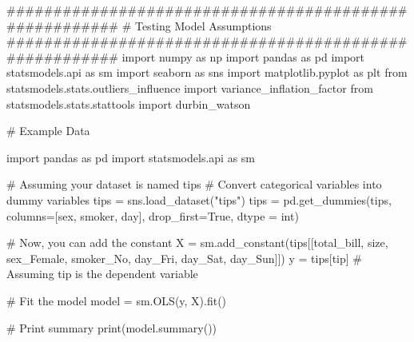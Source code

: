 \documentclass[
  letterpaper,
  DIV=11,
  numbers=noendperiod]{scrreprt}
\newenvironment{Shaded}{\begin{snugshade}}{\end{snugshade}}
\newcommand{\BuiltInTok}[1]{\textcolor[rgb]{0.00,0.23,0.31}{#1}}
\newcommand{\CommentTok}[1]{\textcolor[rgb]{0.37,0.37,0.37}{#1}}
\newcommand{\ImportTok}[1]{\textcolor[rgb]{0.00,0.46,0.62}{#1}}
\newcommand{\NormalTok}[1]{\textcolor[rgb]{0.00,0.23,0.31}{#1}}
\newcommand{\OperatorTok}[1]{\textcolor[rgb]{0.37,0.37,0.37}{#1}}
\newcommand{\StringTok}[1]{\textcolor[rgb]{0.13,0.47,0.30}{#1}}
\newcommand{\VariableTok}[1]{\textcolor[rgb]{0.07,0.07,0.07}{#1}}
\begin{document}
\begin{Shaded}
\begin{Highlighting}[]
\CommentTok{\#\#\#\#\#\#\#\#\#\#\#\#\#\#\#\#\#\#\#\#\#\#\#\#\#\#\#\#\#\#\#\#\#\#\#\#\#\#\#\#\#\#\#\#\#\#\#\#\#\#\#\#\#\#\#}
\CommentTok{\# Testing Model Assumptions }
\CommentTok{\#\#\#\#\#\#\#\#\#\#\#\#\#\#\#\#\#\#\#\#\#\#\#\#\#\#\#\#\#\#\#\#\#\#\#\#\#\#\#\#\#\#\#\#\#\#\#\#\#\#\#\#\#\#\#}
\ImportTok{import}\NormalTok{ numpy }\ImportTok{as}\NormalTok{ np}
\ImportTok{import}\NormalTok{ pandas }\ImportTok{as}\NormalTok{ pd}
\ImportTok{import}\NormalTok{ statsmodels.api }\ImportTok{as}\NormalTok{ sm}
\ImportTok{import}\NormalTok{ seaborn }\ImportTok{as}\NormalTok{ sns}
\ImportTok{import}\NormalTok{ matplotlib.pyplot }\ImportTok{as}\NormalTok{ plt}
\ImportTok{from}\NormalTok{ statsmodels.stats.outliers\_influence }\ImportTok{import}\NormalTok{ variance\_inflation\_factor}
\ImportTok{from}\NormalTok{ statsmodels.stats.stattools }\ImportTok{import}\NormalTok{ durbin\_watson}

\CommentTok{\# Example Data}

\ImportTok{import}\NormalTok{ pandas }\ImportTok{as}\NormalTok{ pd}
\ImportTok{import}\NormalTok{ statsmodels.api }\ImportTok{as}\NormalTok{ sm}

\CommentTok{\# Assuming your dataset is named \textquotesingle{}tips\textquotesingle{}}
\CommentTok{\# Convert categorical variables into dummy variables}
\NormalTok{tips }\OperatorTok{=}\NormalTok{ sns.load\_dataset(}\StringTok{"tips"}\NormalTok{)}
\NormalTok{tips }\OperatorTok{=}\NormalTok{ pd.get\_dummies(tips, columns}\OperatorTok{=}\NormalTok{[}\StringTok{\textquotesingle{}sex\textquotesingle{}}\NormalTok{, }\StringTok{\textquotesingle{}smoker\textquotesingle{}}\NormalTok{, }\StringTok{\textquotesingle{}day\textquotesingle{}}\NormalTok{], drop\_first}\OperatorTok{=}\VariableTok{True}\NormalTok{,}
\NormalTok{                       dtype }\OperatorTok{=} \BuiltInTok{int}\NormalTok{)}

\CommentTok{\# Now, you can add the constant}
\NormalTok{X }\OperatorTok{=}\NormalTok{ sm.add\_constant(tips[[}\StringTok{\textquotesingle{}total\_bill\textquotesingle{}}\NormalTok{, }\StringTok{\textquotesingle{}size\textquotesingle{}}\NormalTok{, }\StringTok{\textquotesingle{}sex\_Female\textquotesingle{}}\NormalTok{, }\StringTok{\textquotesingle{}smoker\_No\textquotesingle{}}\NormalTok{, }\StringTok{\textquotesingle{}day\_Fri\textquotesingle{}}\NormalTok{, }\StringTok{\textquotesingle{}day\_Sat\textquotesingle{}}\NormalTok{, }\StringTok{\textquotesingle{}day\_Sun\textquotesingle{}}\NormalTok{]])}
\NormalTok{y }\OperatorTok{=}\NormalTok{ tips[}\StringTok{\textquotesingle{}tip\textquotesingle{}}\NormalTok{]  }\CommentTok{\# Assuming \textquotesingle{}tip\textquotesingle{} is the dependent variable}

\CommentTok{\# Fit the model}
\NormalTok{model }\OperatorTok{=}\NormalTok{ sm.OLS(y, X).fit()}

\CommentTok{\# Print summary}
\BuiltInTok{print}\NormalTok{(model.summary())}
\end{Highlighting}
\end{Shaded}
\end{document}
